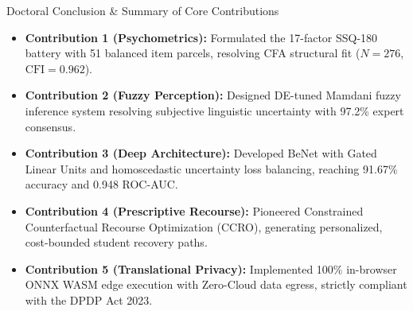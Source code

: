 \documentclass{beamer}
\begin{document}
\begin{frame}{Doctoral Conclusion \& Summary of Core Contributions}
  \begin{itemize}\setlength{\itemsep}{7pt}\small
    \item \textbf{Contribution 1 (Psychometrics):} Formulated the 17-factor SSQ-180 battery with 51 balanced item parcels, resolving CFA structural fit ($N=276$, $\text{CFI}=0.962$).
    
    \item \textbf{Contribution 2 (Fuzzy Perception):} Designed DE-tuned Mamdani fuzzy inference system resolving subjective linguistic uncertainty with 97.2\% expert consensus.
    
    \item \textbf{Contribution 3 (Deep Architecture):} Developed BeNet with Gated Linear Units and homoscedastic uncertainty loss balancing, reaching 91.67\% accuracy and 0.948 ROC-AUC.
    
    \item \textbf{Contribution 4 (Prescriptive Recourse):} Pioneered Constrained Counterfactual Recourse Optimization (CCRO), generating personalized, cost-bounded student recovery paths.
    
    \item \textbf{Contribution 5 (Translational Privacy):} Implemented 100\% in-browser ONNX WASM edge execution with Zero-Cloud data egress, strictly compliant with the DPDP Act 2023.
  \end{itemize}
\end{frame}
\end{document}
